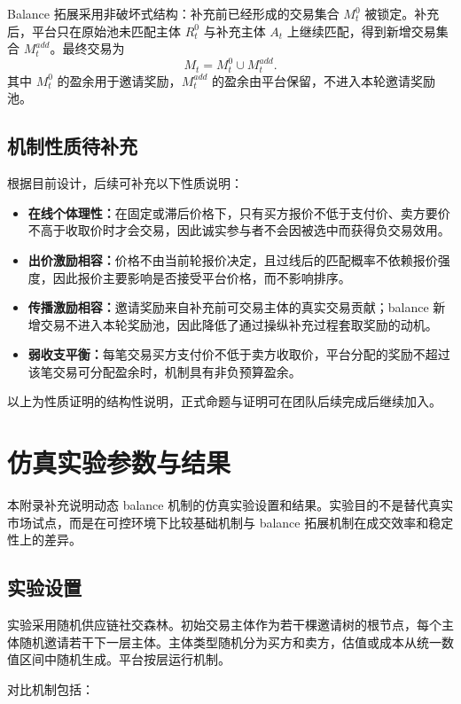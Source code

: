 \documentclass[UTF8,a4paper,12pt]{ctexart}
\begin{document}
Balance 拓展采用非破坏式结构：补充前已经形成的交易集合 \(M_t^0\) 被锁定。补充后，平台只在原始池未匹配主体 \(R_t^0\) 与补充主体 \(A_t\) 上继续匹配，得到新增交易集合 \(M_t^{add}\)。最终交易为
\[
    M_t=M_t^0\cup M_t^{add}.
\]
其中 \(M_t^0\) 的盈余用于邀请奖励，\(M_t^{add}\) 的盈余由平台保留，不进入本轮邀请奖励池。

\subsection{机制性质待补充}

根据目前设计，后续可补充以下性质说明：

\begin{itemize}
    \item \textbf{在线个体理性：}在固定或滞后价格下，只有买方报价不低于支付价、卖方要价不高于收取价时才会交易，因此诚实参与者不会因被选中而获得负交易效用。
    \item \textbf{出价激励相容：}价格不由当前轮报价决定，且过线后的匹配概率不依赖报价强度，因此报价主要影响是否接受平台价格，而不影响排序。
    \item \textbf{传播激励相容：}邀请奖励来自补充前可交易主体的真实交易贡献；balance 新增交易不进入本轮奖励池，因此降低了通过操纵补充过程套取奖励的动机。
    \item \textbf{弱收支平衡：}每笔交易买方支付价不低于卖方收取价，平台分配的奖励不超过该笔交易可分配盈余时，机制具有非负预算盈余。
\end{itemize}

以上为性质证明的结构性说明，正式命题与证明可在团队后续完成后继续加入。

\section{仿真实验参数与结果}

本附录补充说明动态 balance 机制的仿真实验设置和结果。实验目的不是替代真实市场试点，而是在可控环境下比较基础机制与 balance 拓展机制在成交效率和稳定性上的差异。

\subsection{实验设置}

实验采用随机供应链社交森林。初始交易主体作为若干棵邀请树的根节点，每个主体随机邀请若干下一层主体。主体类型随机分为买方和卖方，估值或成本从统一数值区间中随机生成。平台按层运行机制。

对比机制包括：
\end{document}
